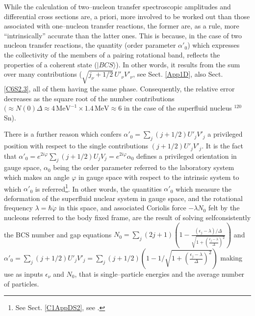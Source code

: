 While the calculation of two--nucleon transfer spectroscopic amplitudes and differential cross sections are, a priori, more involved to be worked out than those associated with one--nucleon transfer reactions, the former are, as a rule, more ``intrinsically'' accurate than the latter ones. This is because, in the case of two nucleon transfer reactions, the quantity (order parameter $\alpha'_0$) which expresses the collectivity of the members of a pairing rotational band, reflects the properties of a coherent state ($|BCS\rangle$). In other words, it results from the sum over many contributions ($\sqrt{j_{\nu}+1/2}\,U'_\nu V'_\nu$, see Sect. \ref{App1D}, also Sect. \ref{C6S2.3}, all of them having the same phase. Consequently, the relative error decreases as the square root of the number contributions $(\approx N(0)\Delta\approx 4\,\text{MeV}^{-1}\times 1.4\,\text{MeV}\approx 6$ in the case of the superfluid nucleus $^{120}$Sn). 

There is a further reason which confers $\alpha'_0=\sum_j(j+1/2)U'_jV'_j$ a privileged position with respect to the single contributions $(j+1/2)U'_jV'_j$. It is the fact that $\alpha'_0=e^{2i\varphi}\sum_j(j+1/2)U_jV_j=e^{2i\varphi}\alpha_0$ defines a privileged orientation in gauge space, $\alpha_0$ being the order parameter referred to the laboratory system which makes an angle $\varphi$ in gauge space with respect to the intrinsic system to which $\alpha'_0$ is referred\footnote{See Sect. \ref{C1AppDS2}, see \cite{Potel:13b}.}. In other words, the quantities $\alpha'_0$ which measure the deformation of the superfluid nuclear system in gauge space, and the rotational frequency $\lambda=\hbar\dot\varphi$ in this space, and associated Coriolis force $-\lambda N_0$ felt by the nucleons referred to the body fixed frame, are the result of solving selfconsistently the BCS number and gap equations
$N_0=\sum_j(2j+1)\left(1-\frac{(\epsilon_j-\lambda)/\Delta}{\sqrt{1+\left(\frac{\epsilon_j-\lambda}{\Delta}\right)^2}}\right)$ and $\alpha'_0=\sum_j(j+1/2)U'_jV'_j=\sum_j(j+1/2)\left(1-1/\sqrt{1+(\frac{\epsilon_j-\lambda}{\Delta})^2}\right)$ making use as inputs $\epsilon_\nu$ and $ N_0$, that is single--particle energies and the average number of particles.


